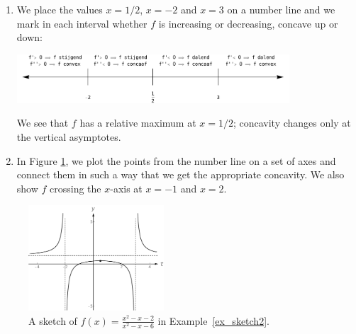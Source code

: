 \begin{example}
\begin{enumerate}
		\item		We place the values $x=1/2$, $x=-2$ and $x=3$ on a number line and we mark in each interval whether $f$ is increasing or decreasing, concave up or down:
		
	\begin{center}
			\includegraphics[width=0.8\textwidth]{fig_behaviour_26}
	\end{center}
	
	
		We see that $f$ has a relative maximum at $x=1/2$; concavity changes only at the vertical asymptotes.
		
		\item		In Figure \ref{fig_behaviour_27}, we plot the points from the number line on a set of axes and connect them in such a way that we get the appropriate concavity. We also show $f$ crossing the $x$-axis at $x=-1$ and $x=2$.
\end{enumerate}

\begin{figure}[H]
	\begin{center}
			\includegraphics[width=0.45\textwidth]{fig_behaviour_27}
	\caption{A sketch of $f(x) = \frac{x^2-x-2}{x^2-x-6}$ in Example~\ref{ex_sketch2}.}
	\label{fig_behaviour_27}
	\end{center}
\end{figure}

\end{example}





